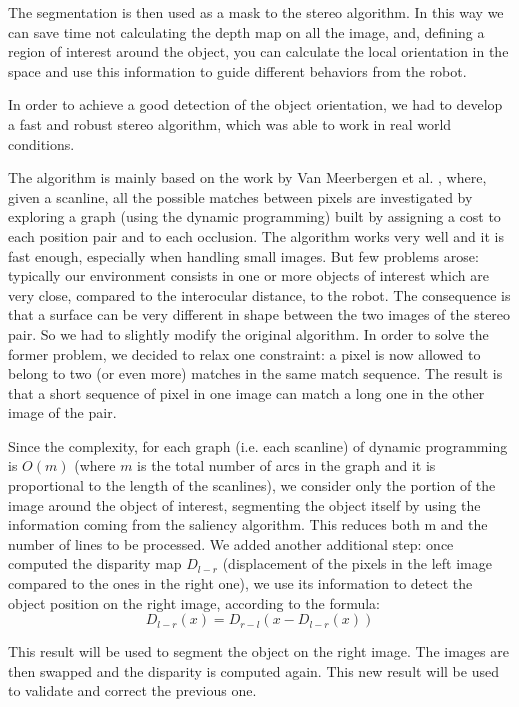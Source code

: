 The segmentation is then used as a mask to the stereo algorithm. In this way we can save time not calculating the depth map on all the image, and, defining a region of interest around the object, you can calculate the local orientation in the space and use this information to guide different behaviors from the robot.

In order to achieve a good detection of the object orientation, we had to develop a fast and robust stereo algorithm, which was able to work in real world conditions.

The algorithm is mainly based on the work by Van Meerbergen et al. \cite{merrbergen02stereo}, where, given a scanline, all the possible matches between pixels are investigated by exploring a graph (using the dynamic programming) built by assigning a cost to each position pair and to each occlusion. The algorithm works very well and it is fast enough, especially when handling small images. But few problems arose: typically our environment consists in one or more objects of interest which are very close, compared to the interocular distance, to the robot. The consequence is that a surface can be very different in shape between the two images of the stereo pair. So we had to slightly modify the original algorithm. In order to solve the former problem, we decided to relax one constraint: a pixel is now allowed to belong to two (or even more) matches in the same match sequence. The result is that a short sequence of pixel in one image can match a long one in the other image of the pair. 

Since the complexity, for each graph (i.e. each scanline) of dynamic programming is $O(m)$ (where $m$ is the total number of arcs in the graph and it is proportional to the length of the scanlines), we consider only the portion of the image around the object of interest, segmenting the object itself by using the information coming from the saliency algorithm. This reduces both m and the number of  lines to be processed.
We added another additional step: once computed the disparity map $D_{l-r}$ (displacement of the pixels in the left image compared to the ones in the right one), we use its information to detect the object position on the right image, according to the formula: 
\begin{equation}D_{l-r}(x)=D_{r-l}(x-D_{l-r}(x))\end{equation}

This result will be used to segment the object on the right image. The images are then swapped and the disparity is computed again. This new result will be used to validate and correct the previous one.

